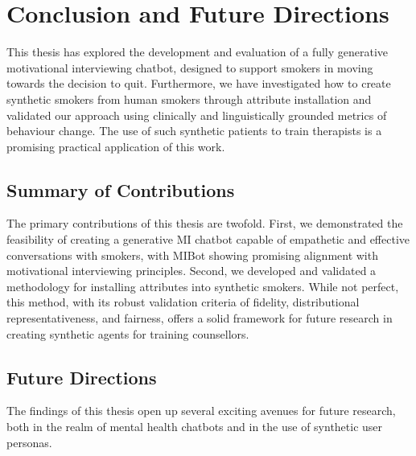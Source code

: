 \chapter{Conclusion and Future Directions}
\label{ch:conclusion}

This thesis has explored the development and evaluation of a fully generative
motivational interviewing chatbot, designed to support smokers in moving towards the
decision to quit. Furthermore, we have investigated how to create synthetic smokers
from human smokers through attribute installation and validated our approach using
clinically and linguistically grounded metrics of behaviour change. The use of such
synthetic patients to train therapists is a promising practical application of this
work.

\section{Summary of Contributions}

The primary contributions of this thesis are twofold. First, we demonstrated the
feasibility of creating a generative MI chatbot capable of empathetic and effective
conversations with smokers, with MIBot showing promising alignment with motivational
interviewing principles. Second, we developed and validated a methodology for
installing attributes into synthetic smokers. While not perfect, this method, with its
robust validation criteria of fidelity, distributional representativeness, and
fairness, offers a solid framework for future research in creating synthetic agents for
training counsellors.

\section{Future Directions}
The findings of this thesis open up several exciting avenues for future research, both
in the realm of mental health chatbots and in the use of synthetic user personas.

